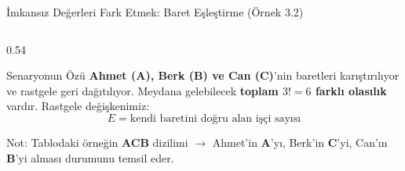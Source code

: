 \documentclass[light]{lutbeamer}
\begin{document}
\begin{frame}{İmkansız Değerleri Fark Etmek: Baret Eşleştirme (Örnek 3.2)}
\footnotesize
\vspace{-1cm}
\begin{columns}[T]
  \begin{column}{0.54\textwidth}
    \begin{block}{Senaryonun Özü}
      \textbf{Ahmet (A), Berk (B) ve Can (C)}'nin baretleri karıştırılıyor ve rastgele geri dağıtılıyor. Meydana gelebilecek \textbf{toplam $3! = 6$ farklı olasılık} vardır.
      Rastgele değişkenimiz:
      \[
      E = \text{kendi baretini doğru alan işçi sayısı}
      \]
    \end{block}

    \vspace{0.05cm}
    \scriptsize
    Not: Tablodaki örneğin \textbf{ACB} dizilimi $\rightarrow$ Ahmet'in \textbf{A}'yı, Berk'in \textbf{C}'yi, Can'ın \textbf{B}'yi alması durumunu temsil eder.


\end{column}
\end{columns}
\end{frame}
\end{document}
